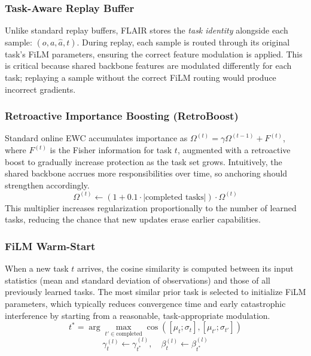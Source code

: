 \documentclass[3p,times,procedia]{elsarticle}
\begin{document}
\subsubsection{Task-Aware Replay Buffer}

Unlike standard replay buffers, FLAIR stores the \emph{task identity} alongside each sample: $(o, a, \hat{a}, t)$. During replay, each sample is routed through its original task's FiLM parameters, ensuring the correct feature modulation is applied. This is critical because shared backbone features are modulated differently for each task; replaying a sample without the correct FiLM routing would produce incorrect gradients.

\subsubsection{Retroactive Importance Boosting (RetroBoost)}

Standard online EWC accumulates importance as $\Omega^{(t)} = \gamma \Omega^{(t-1)} + F^{(t)}$, where $F^{(t)}$ is the Fisher information for task $t$, augmented with a retroactive boost to gradually increase protection as the task set grows. Intuitively, the shared backbone accrues more responsibilities over time, so anchoring should strengthen accordingly.
\begin{equation}
    \Omega^{(t)} \leftarrow \left(1 + 0.1 \cdot |\text{completed tasks}|\right) \cdot \Omega^{(t)}
\end{equation}
This multiplier increases regularization proportionally to the number of learned tasks, reducing the chance that new updates erase earlier capabilities.

\subsubsection{FiLM Warm-Start}

When a new task $t$ arrives, the cosine similarity is computed between its input statistics (mean and standard deviation of observations) and those of all previously learned tasks. The most similar prior task is selected to initialize FiLM parameters, which typically reduces convergence time and early catastrophic interference by starting from a reasonable, task-appropriate modulation.
\begin{equation}
    t^* = \arg\max_{t' \in \text{completed}} \cos\left([\mu_t; \sigma_t], [\mu_{t'}; \sigma_{t'}]\right)
\end{equation}
\begin{equation}
    \gamma_t^{(l)} \leftarrow \gamma_{t^*}^{(l)}, \quad \beta_t^{(l)} \leftarrow \beta_{t^*}^{(l)}
\end{equation}
\end{document}
